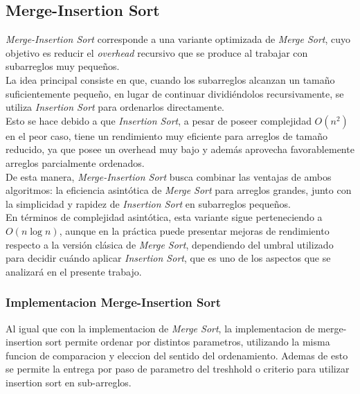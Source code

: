 \newpage

\subsection{Merge-Insertion Sort}

\textit{Merge-Insertion Sort} corresponde a una variante optimizada de \textit{Merge Sort}, cuyo objetivo es reducir el \textit{overhead} recursivo que se 
produce al trabajar con subarreglos muy pequeños. \\

La idea principal consiste en que, cuando los subarreglos alcanzan un tamaño suficientemente pequeño, en lugar de continuar dividiéndolos recursivamente, 
se utiliza \textit{Insertion Sort} para ordenarlos directamente. \\

Esto se hace debido a que \textit{Insertion Sort}, a pesar de poseer complejidad $O(n^2)$ en el peor caso, tiene un rendimiento muy eficiente para arreglos 
de tamaño reducido, ya que posee un overhead muy bajo y además aprovecha favorablemente arreglos parcialmente ordenados. \\

De esta manera, \textit{Merge-Insertion Sort} busca combinar las ventajas de ambos algoritmos: la eficiencia asintótica de \textit{Merge Sort} para arreglos 
grandes, junto con la simplicidad y rapidez de \textit{Insertion Sort} en subarreglos pequeños. \\

En términos de complejidad asintótica, esta variante sigue perteneciendo a $O(n \log n)$, aunque en la práctica puede presentar mejoras de rendimiento 
respecto a la versión clásica de \textit{Merge Sort}, dependiendo del umbral utilizado para decidir cuándo aplicar \textit{Insertion Sort}, que es uno de
los aspectos que se analizará en el presente trabajo. \\

\subsubsection{Implementacion Merge-Insertion Sort}

Al igual que con la implementacion de \textit{Merge Sort}, la implementacion de merge-insertion sort permite ordenar por distintos parametros, utilizando la 
misma funcion de comparacion y eleccion del sentido del ordenamiento. Ademas de esto se permite la entrega por paso de parametro del treshhold o criterio para 
utilizar insertion sort en sub-arreglos.  \\


